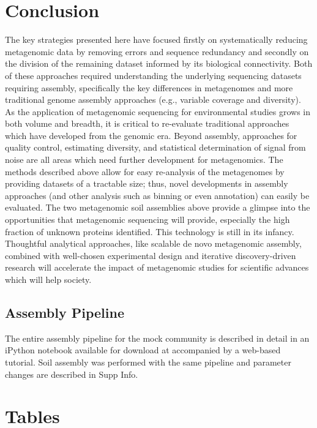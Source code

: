\documentclass[11pt]{article} %
\begin{document}
\section{Conclusion}
The key strategies presented here have focused firstly on
systematically reducing metagenomic data by removing errors and
sequence redundancy and secondly on the division of the remaining
dataset informed by its biological connectivity.  Both of these
approaches required understanding the underlying sequencing datasets
requiring assembly, specifically the key differences in metagenomes
and more traditional genome assembly approaches (e.g., variable
coverage and diversity).  As the application of metagenomic sequencing
for environmental studies grows in both volume and breadth, it is
critical to re-evaluate traditional approaches which have developed
from the genomic era.  Beyond assembly, approaches for quality
control, estimating diversity, and statistical determination of signal
from noise are all areas which need further development for
metagenomics.  The methods described above allow for easy re-analysis
of the metagenomes by providing datasets of a tractable size; thus,
novel developments in assembly approaches (and other analysis such as
binning or even annotation) can easily be evaluated.  The two
metagenomic soil assemblies above provide a glimpse into the
opportunities that metagenomic sequencing will provide, especially the
high fraction of unknown proteins identified.  This technology is
still in its infancy.  Thoughtful analytical approaches, like scalable
de novo metagenomic assembly, combined with well-chosen experimental
design and iterative discovery-driven research will accelerate the
impact of metagenomic studies for scientific advances which will help
society.

\subsection{Assembly Pipeline}
The entire assembly pipeline for the mock community is described in
detail in an iPython notebook available for download at \cite{url2,url1}
accompanied by a web-based tutorial.  Soil assembly was performed with
the same pipeline and parameter changes are described in Supp Info.



\pagebreak

\section{Tables}
\end{document}
